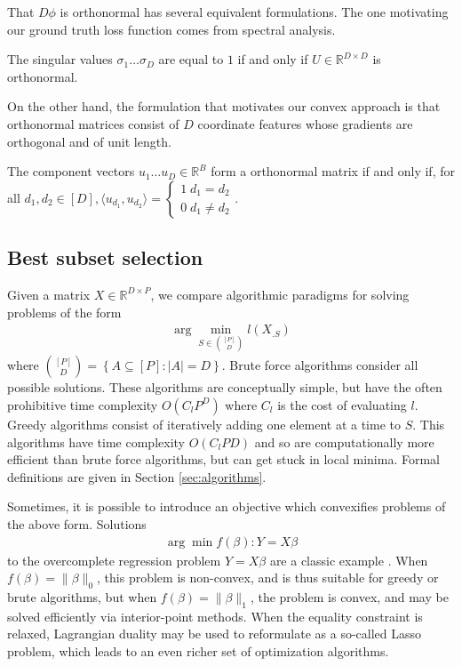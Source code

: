 That $D\phi$ is orthonormal has several equivalent formulations.
The one motivating our ground truth loss function comes from spectral analysis.
\begin{proposition}
\label{prop:orthonormal_spectrum}
The singular values $\sigma_1 \dots \sigma_D$ are equal to $1$ if and only if $U \in \mathbb{R}^{D \times D}$ is orthonormal.
\end{proposition}
On the other hand, the formulation that motivates our convex approach is that orthonormal matrices consist of $D$ coordinate features whose gradients are orthogonal and of unit length.
\begin{proposition}
\label{prop:orthonormal_basis}
The component vectors $u_1 \dots u_D \in \mathbb R^B$ form a orthonormal matrix if and only if, for all $d_1, d_2 \in [D], \langle u_{d_1}, u_{d_2} \rangle = \begin{cases}
1 \; d_1 = d_2 \\ 
0 \; d_1 \neq d_2 
\end{cases}$.
\end{proposition}


\subsection{Best subset selection}

Given a matrix $ X \in \mathbb R^{D \times P}$, we compare algorithmic paradigms for solving problems of the form
\begin{align}
\label{prog:ground_truth}
\arg \min_{ S \in \binom{[P]}{D}} l ( X_{. S})
\end{align}
where $\binom{[P]}{D} = \left\{ A \subseteq [P] : \left|A\right| = D \right\}$.
Brute force algorithms consider all possible solutions.
These algorithms are conceptually simple, but have the often prohibitive time complexity $O(C_lP^D)$ where $C_l$ is the cost of evaluating $l$.
Greedy algorithms consist of iteratively adding one element at a time to $ S$.
This algorithms have time complexity $O(C_lPD)$ and so are computationally more efficient than brute force algorithms, but can get stuck in local minima.
Formal definitions are given in Section \ref{sec:algorithms}.

Sometimes, it is possible to introduce an objective which convexifies problems of the above form.
Solutions
\begin{align}
\arg \min f(\beta) : Y  = X\beta 
\end{align}
to the overcomplete regression problem $Y = X \beta$ are a classic example \citep{Chen2001-hh}.
When $f(\beta) = \|\beta\|_0$, this problem is non-convex, and is thus suitable for greedy or brute algorithms, but when $f(\beta) =\|\beta\|_1$, the problem is convex, and may be solved efficiently via interior-point methods.
When the equality constraint is relaxed, Lagrangian duality may be used to reformulate as a so-called Lasso problem, which leads to an even richer set of optimization algorithms. %

